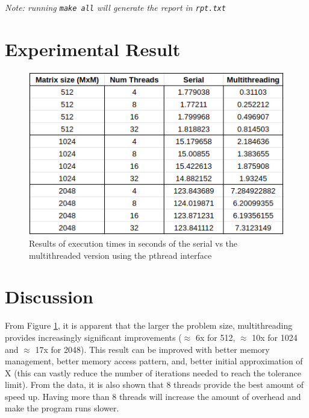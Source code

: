 \documentclass[letterpaper, 11pt]{article}
\begin{document}
\textit{Note: running \texttt{make all} will generate the report in \texttt{rpt.txt}}

\section{Experimental Result}

\begin{figure}[htb!]
	\centering
	\includegraphics[width=0.6\linewidth]{results.png}
	\caption{Results of execution times in seconds of the serial vs the multithreaded version using the pthread interface}
	\label{fig1}
\end{figure}

\section{Discussion}

From Figure \ref{fig1}, it is apparent that the larger the problem size, multithreading provides increasingly significant improvements ($\approx$ 6x for 512, $\approx$ 10x for 1024 and $\approx$ 17x for 2048). This result can be improved with better memory management, better memory access pattern, and, better initial approximation of X (this can vastly reduce the number of iterations needed to reach the tolerance limit).
From the data, it is also shown that 8 threads provide the best amount of speed up. Having more than 8 threads will increase the amount of overhead and make the program runs slower.
\end{document}
